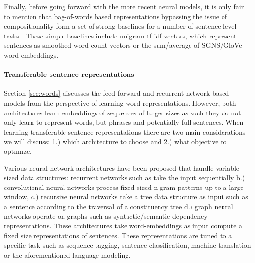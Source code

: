 Finally, before going forward with the more recent neural models,
it is only fair to mention that bag-of-words
based representations bypassing the issue of compositionality form a set of strong baselines
for a number of sentence level tasks \citep{hill2016learning}.
These simple baselines include unigram tf-idf vectors, which represent sentences as
smoothed word-count vectors or the sum/average of SGNS/GloVe word-embeddings.

\paragraph{Transferable sentence representations}
\label{sec:trans-sentence}

Section \ref{sec:words} discusses the feed-forward \citep{bengio2003neural}
and recurrent network based models \citep{mikolov2010recurrent} from the perspective
of learning word-representations. However, both architectures learn embeddings
of sequences of larger sizes as such they do not only learn to represent
words, but phrases and potentially full sentences. When learning transferable
sentence representations there are two main considerations we will discuss:
1.) which architecture to choose and 2.) what objective to optimize.

Various neural network architectures have been proposed that
handle variable sized data structures: recurrent networks such as
take the input sequentially
b.) convolutional neural networks
\citep{kalchbrenner2014convolutional,zhang2015character,conneau2016very,chen2013learning}
process fixed sized n-gram patterns up to a large window,
c.) recursive neural networks \citep{goller1996learning.socher2011parsing,tai2015improved}
take a tree data structure as input such as a sentence according to the traversal of a
constituency tree d.) graph neural networks operate on graphs \citep{marcheggiani2017encoding} such as
syntactic/semantic-dependency representations.
These architectures take word-embeddings as input compute a fixed size representations of
sentences. These representations are tuned to a specific task such as sequence tagging,
sentence classification, machine translation or the aforementioned language modeling.


